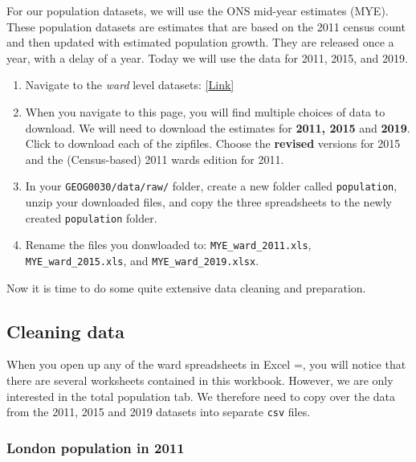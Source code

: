 \documentclass[
]{book}
\providecommand{\tightlist}{%
  \setlength{\itemsep}{0pt}\setlength{\parskip}{0pt}}
\begin{document}
For our population datasets, we will use the ONS mid-year estimates (MYE). These population datasets are estimates that are based on the 2011 census count and then updated with estimated population growth. They are released once a year, with a delay of a year. Today we will use the data for 2011, 2015, and 2019.

\begin{enumerate}
\def\labelenumi{\arabic{enumi}.}
\tightlist
\item
  Navigate to the \emph{ward} level datasets: \href{https://www.ons.gov.uk/peoplepopulationandcommunity/populationandmigration/populationestimates/datasets/wardlevelmidyearpopulationestimatesexperimental}{{[}Link{]}}
\item
  When you navigate to this page, you will find multiple choices of data to download. We will need to download the estimates for \textbf{2011, 2015} and \textbf{2019}. Click to download each of the zipfiles. Choose the \textbf{revised} versions for 2015 and the (Census-based) 2011 wards edition for 2011.
\item
  In your \texttt{GEOG0030/data/raw/} folder, create a new folder called \texttt{population}, unzip your downloaded files, and copy the three spreadsheets to the newly created \texttt{population} folder.
\item
  Rename the files you donwloaded to: \texttt{MYE\_ward\_2011.xls}, \texttt{MYE\_ward\_2015.xls}, and \texttt{MYE\_ward\_2019.xlsx}.
\end{enumerate}

Now it is time to do some quite extensive data cleaning and preparation.

\hypertarget{w02-cleaning}{%
\subsection{Cleaning data}\label{w02-cleaning}}

When you open up any of the ward spreadsheets in Excel =, you will notice that there are several worksheets contained in this workbook. However, we are only interested in the total population tab. We therefore need to copy over the data from the 2011, 2015 and 2019 datasets into separate \texttt{csv} files.

\hypertarget{london-population-in-2011}{%
\subsubsection{London population in 2011}\label{london-population-in-2011}}
\end{document}
